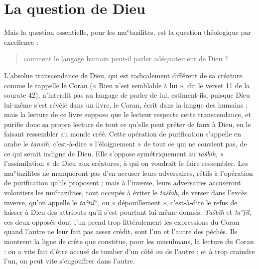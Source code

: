 \hypertarget{la-question-de-dieu}{%
\section{La question de Dieu}\label{la-question-de-dieu}}

Mais la question essentielle, pour les muʿtazilites, est la question
théologique par excellence : 
\begin{quote}
    comment le langage humain peut-il parler
adéquatement de Dieu ?
\end{quote}
 L'absolue transcendance de Dieu, qui est
radicalement différent de sa créature comme le rappelle le Coran (« Rien
n'est semblable à lui », dit le verset 11 de la sourate 42), n'interdit
pas au langage de parler de lui, estiment-ils, puisque Dieu lui-même
s'est révélé dans un livre, le Coran, écrit dans la langue des humains ;
mais la lecture de ce livre suppose que le lecteur respecte cette
transcendance, et purifie donc sa propre lecture de tout ce qu'elle peut
prêter de faux à Dieu, en le faisant ressembler au monde créé. Cette
opération de purification s'appelle en arabe le \emph{tanzīh},
c'est-à-dire « l'éloignement » de tout ce qui ne convient pas, de ce qui
serait indigne de Dieu. Elle s'oppose symétriquement au \emph{tašbīh},
« l'assimilation » de Dieu aux créatures, à qui on voudrait le faire
ressembler. Les muʿtazilites ne manqueront pas d'en accuser leurs
adversaires, rétifs à l'opération de purification qu'ils proposent ;
mais à l'inverse, leurs adversaires accuseront volontiers les
muʿtazilites, tout occupés à éviter le \emph{tašbīh}, de verser dans
l'excès inverse, qu'on appelle le \emph{taʿṭīl}*, ou « dépouillement »,
c'est-à-dire le refus de laisser à Dieu des attributs qu'il s'est
pourtant lui-même donnés. \emph{Tašbīh} et \emph{taʿṭīl}, ces deux
opposés dont l'un prend trop littéralement les expressions du Coran
quand l'autre ne leur fait pas assez crédit, sont l'un et l'autre des
péchés. Ils montrent la ligne de crête que constitue, pour les
musulmans, la lecture du Coran : on a vite fait d'être accusé de tomber
d'un côté ou de l'autre ; et à trop craindre l'un, on peut vite
s'engouffrer dans l'autre.

